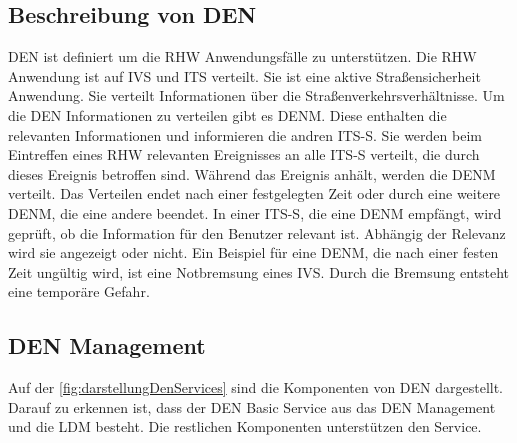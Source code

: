 \subsection{Beschreibung von DEN \label{facilityLayer_beschreibungDEN}}
\ac{DEN} ist definiert um die \ac{RHW} Anwendungsfälle zu unterstützen.	Die \ac{RHW} Anwendung ist auf \ac{IVS} und \ac{ITS} verteilt. Sie ist eine aktive Straßensicherheit Anwendung. Sie verteilt Informationen über die Straßenverkehrsverhältnisse. Um die \ac{DEN} Informationen zu verteilen gibt es \ac{DENM}. Diese enthalten die relevanten Informationen und informieren die andren \ac{ITS-S}. Sie werden beim Eintreffen eines \ac{RHW} relevanten Ereignisses an alle \ac{ITS-S} verteilt, die durch dieses Ereignis betroffen sind. Während das Ereignis anhält, werden die \ac{DENM} verteilt. Das Verteilen endet nach einer festgelegten Zeit oder durch eine weitere \ac{DENM}, die eine andere beendet. In einer \ac{ITS-S}, die eine \ac{DENM} empfängt, wird geprüft, ob die Information für den Benutzer relevant ist. Abhängig der Relevanz wird sie angezeigt oder nicht. Ein Beispiel für eine \ac{DENM}, die nach einer festen Zeit ungültig wird, ist eine Notbremsung eines \ac{IVS}. Durch die Bremsung entsteht eine temporäre Gefahr. 


\subsection{DEN Management}
Auf der \autoref{fig:darstellungDenServices} sind die Komponenten von \ac{DEN} dargestellt. Darauf zu erkennen ist, dass der \ac{DEN} Basic Service aus das \ac{DEN} Management und die \ac{LDM} besteht. Die restlichen Komponenten unterstützen den Service. 

